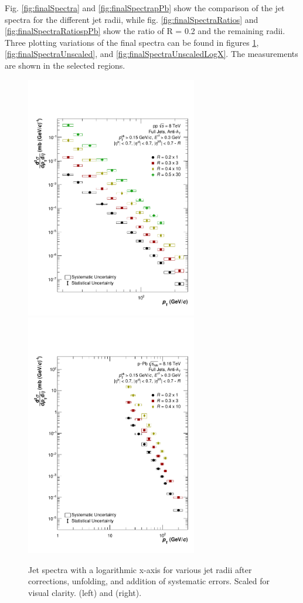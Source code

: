 Fig. \ref{fig:finalSpectra} and \ref{fig:finalSpectrapPb} show the comparison of the jet \pT spectra for the different jet radii, while fig. \ref{fig:finalSpectraRatios} and \ref{fig:finalSpectraRatiospPb} show the ratio of R = 0.2 and the remaining radii. Three plotting variations of the final spectra can be found in figures \ref{fig:finalSpectraLogX}, \ref{fig:finalSpectraUnscaled}, and \ref{fig:finalSpectraUnscaledLogX}.
The measurements are shown in the selected \pT regions.

\begin{figure}
    \centering
    \includegraphics[width=7.5cm]{figures/FinalResults/Bayes_reg6_logx.pdf}
    \includegraphics[width=7.5cm]{figures/pPbFigures/FinalResults/Bayes_reg6_logx.pdf}
    \caption{Jet spectra with a logarithmic x-axis for various jet radii after corrections, unfolding, and addition of systematic errors. Scaled for visual clarity. \pp (left) and \pPb (right).}
    \label{fig:finalSpectraLogX}
\end{figure}

